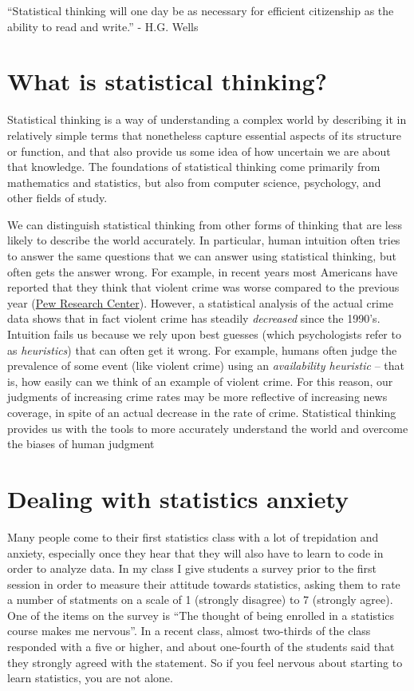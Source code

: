 \documentclass[
  12pt,
]{book}
\begin{document}
``Statistical thinking will one day be as necessary for efficient citizenship as the ability to read and write.'' - H.G. Wells

\hypertarget{what-is-statistical-thinking}{%
\section{What is statistical thinking?}\label{what-is-statistical-thinking}}

Statistical thinking is a way of understanding a complex world by describing it in relatively simple terms that nonetheless capture essential aspects of its structure or function, and that also provide us some idea of how uncertain we are about that knowledge. The foundations of statistical thinking come primarily from mathematics and statistics, but also from computer science, psychology, and other fields of study.

We can distinguish statistical thinking from other forms of thinking that are less likely to describe the world accurately. In particular, human intuition often tries to answer the same questions that we can answer using statistical thinking, but often gets the answer wrong. For example, in recent years most Americans have reported that they think that violent crime was worse compared to the previous year (\href{http://www.pewresearch.org/fact-tank/2018/01/30/5-facts-about-crime-in-the-u-s/}{Pew Research Center}). However, a statistical analysis of the actual crime data shows that in fact violent crime has steadily \emph{decreased} since the 1990's. Intuition fails us because we rely upon best guesses (which psychologists refer to as \emph{heuristics}) that can often get it wrong. For example, humans often judge the prevalence of some event (like violent crime) using an \emph{availability heuristic} -- that is, how easily can we think of an example of violent crime. For this reason, our judgments of increasing crime rates may be more reflective of increasing news coverage, in spite of an actual decrease in the rate of crime. Statistical thinking provides us with the tools to more accurately understand the world and overcome the biases of human judgment

\hypertarget{dealing-with-statistics-anxiety}{%
\section{Dealing with statistics anxiety}\label{dealing-with-statistics-anxiety}}

Many people come to their first statistics class with a lot of trepidation and anxiety, especially once they hear that they will also have to learn to code in order to analyze data. In my class I give students a survey prior to the first session in order to measure their attitude towards statistics, asking them to rate a number of statments on a scale of 1 (strongly disagree) to 7 (strongly agree). One of the items on the survey is ``The thought of being enrolled in a statistics course makes me nervous''. In a recent class, almost two-thirds of the class responded with a five or higher, and about one-fourth of the students said that they strongly agreed with the statement. So if you feel nervous about starting to learn statistics, you are not alone.
\end{document}
